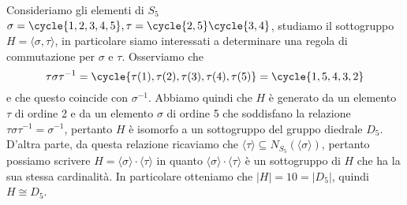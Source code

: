 \documentclass[11pt]{scrartcl}
\begin{document}
Consideriamo gli elementi di $S_5$ $\sigma = \cycle{1, 2, 3, 4, 5}, 
\tau = \cycle{2, 5}\cycle{3, 4}$, studiamo il sottogruppo $H = \langle\sigma, \tau\rangle$,
in particolare siamo interessati a determinare una regola di commutazione
per $\sigma$ e $\tau$. Osserviamo che 
\[
    \tau\sigma\tau^{-1} = \cycle{\tau(1), \tau(2), \tau(3), \tau(4), \tau(5)} = 
    \cycle{1, 5, 4, 3, 2}
\]
e che questo coincide con $\sigma^{-1}$. Abbiamo quindi che $H$ è generato 
da un elemento $\tau$ di ordine 2 e da un elemento $\sigma$ di ordine 5 
che soddisfano la relazione $\tau\sigma\tau^{-1} = \sigma^{-1}$, pertanto 
$H$ è isomorfo a un sottogruppo del gruppo diedrale $D_5$. D'altra parte, 
da questa relazione ricaviamo che $\langle \tau\rangle \subseteq N_{S_5}(\langle\sigma\rangle)$,
pertanto possiamo scrivere $H = \langle\sigma\rangle\cdot\langle\tau\rangle$
in quanto $\langle\sigma\rangle\cdot\langle\tau\rangle$ è un sottogruppo di $H$
che ha la sua stessa cardinalità. In particolare otteniamo che $|H| = 10 = |D_5|$,
quindi $H \cong D_5$.\\

\end{document}

